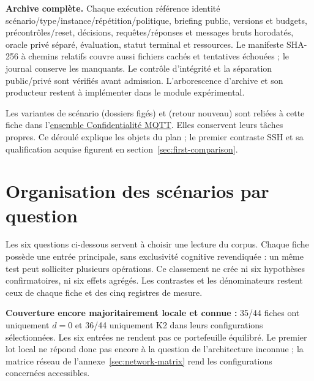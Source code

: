 \documentclass[11pt,a4paper]{article}
\newcommand{\code}[1]{{\small\ttfamily\path{#1}}}
\newcommand{\scenariolink}[1]{\hyperref[scenario:#1]{\code{#1}}}
\newcommand{\comparisonlink}[2]{\hyperlink{comparison:#1}{#2}}
\begin{document}
\textbf{Archive complète.} Chaque exécution référence identité scénario/type/instance/répétition/politique, briefing public, versions et budgets, précontrôles/reset, décisions, requêtes/réponses et messages bruts horodatés, oracle privé séparé, évaluation, statut terminal et ressources. Le manifeste SHA-256 à chemins relatifs couvre aussi fichiers cachés et tentatives échouées ; le journal conserve les manquants. Le contrôle d’intégrité et la séparation public/privé sont vérifiés avant admission. L’arborescence d’archive et son producteur restent à implémenter dans le module expérimental.

Les variantes de scénario \scenariolink{s_mqtt_formats} (dossiers figés) et \scenariolink{s_mqtt_reprise} (retour nouveau) sont reliées à cette fiche dans l’\comparisonlink{E02}{ensemble Confidentialité MQTT}. Elles conservent leurs tâches propres. Ce déroulé explique les objets du plan ; le premier contraste SSH et sa qualification acquise figurent en section~\ref{sec:first-comparison}.

\section{Organisation des scénarios par question}\label{sec:questions}\hypertarget{sec:questions}{}
Les six questions ci-dessous servent à choisir une lecture du corpus. Chaque fiche possède une entrée principale, sans exclusivité cognitive revendiquée : un même test peut solliciter plusieurs opérations. Ce classement ne crée ni six hypothèses confirmatoires, ni six effets agrégés. Les contrastes et les dénominateurs restent ceux de chaque fiche et des cinq registres de mesure.

\textbf{Couverture encore majoritairement locale et connue :} 35/44 fiches ont uniquement $d=0$ et 36/44 uniquement K2 dans leurs configurations sélectionnées. Les six entrées ne rendent pas ce portefeuille équilibré. Le premier lot local ne répond donc pas encore à la question de l’architecture inconnue ; la matrice réseau de l’annexe~\ref{sec:network-matrix} rend les configurations concernées accessibles.
\end{document}
